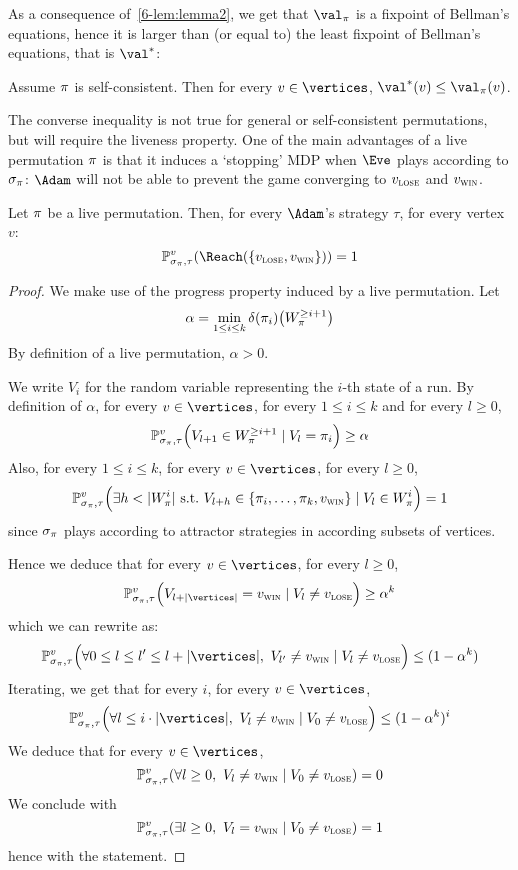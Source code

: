 As a consequence of~\cref{6-lem:lemma2}, we get that $\val_\perm$
is a fixpoint of Bellman's equations, hence it is larger than (or
equal to) the least fixpoint of Bellman's equations, that is $\val^*$:

\begin{corollary}
\label{6-cor:self-consistent_solution}
Assume $\pi$ is self-consistent.  Then for every $v \in
\vertices$, $\val^*(v) \le \val_\perm(v)$.
\end{corollary}

The converse inequality is not true for general or self-consistent
permutations, but will require the liveness property. One of the main
advantages of a live permutation $\pi$ is that it induces a
`stopping' MDP when $\Eve$ plays according to $\sigma_\pi$: 
$\Adam$ will not be able to prevent the game converging to $v_{\textsc{lose}}$ and $v_{\textsc{win}}$.

\begin{lemma}
\label{6-lem:live_stopping}
Let $\pi$ be a live permutation. Then, for every $\Adam$'s strategy
$\tau$, for every vertex $v$:
\[
\probm^v_{\sigma_\perm,\tau} (\Reach(\{\vlose,\vwin\})) = 1
\]
\end{lemma}

\begin{proof}
We make use of the progress property induced by a live permutation.
Let
\[
\alpha = \min_{1 \le i \le k} \delta(\pi_i) \big(W_\pi^{\ge
i+1}\big)
\]
By definition of a live permutation, $\alpha>0$.

We write $V_i$ for the random variable representing the $i$-th state
of a run.
%
By definition of $\alpha$, for every $v \in \vertices$, for every $1
\le i \le k$ and for every $l \ge 0$,
\[
\mathbb{P}^v_{\sigma_\pi,\tau}\Big(V_{l+1} \in W_\pi^{\ge i+1} \mid
V_l = \pi_i\Big) \ge \alpha
\]
Also, for every $1 \le i \le k$, for every $v \in \vertices$, for
every $l \ge 0$,
\[
\mathbb{P}^v_{\sigma_\pi,\tau}\Big(\exists h < |W_\pi^i|\
\text{s.t.}\ V_{l+h} \in \{\pi_i,\ldots,\pi_k,v_{\textsc{win}}\} \mid V_l
\in W_\pi^i\Big)=1
\]
since $\sigma_\pi$ plays according to attractor strategies in
according subsets of vertices.

Hence we deduce that for every $v \in \vertices$, for every $l \ge
0$,
\[
\probm^v_{\sigma_\perm,\tau}\Big(V_{l+|\vertices|}=\vwin \mid V_l
\ne \vlose\Big) \ge \alpha^k
\]
which we can rewrite as:
\[
\probm^v_{\sigma_\perm,\tau}\Big(\forall 0 \le l \le l' \le
l+|\vertices|,\ V_{l'} \ne \vwin \mid V_l \ne \vlose\Big) \le
(1-\alpha^k)
\]
Iterating, we get that for every $i$, for every $v \in \vertices$,
\[
\probm^v_{\sigma_\perm,\tau}\Big(\forall l \le i \cdot |\vertices|,\
V_{l} \ne \vwin \mid V_0 \ne \vlose\Big) \le (1-\alpha^k)^i
\]
We  deduce that for every $v \in \vertices$,
\[
\probm^v_{\sigma_\perm,\tau}(\forall l \ge 0,\ V_l \ne \vwin \mid
V_0 \ne \vlose) = 0
\]
We conclude with
\[
\probm^v_{\sigma_\perm,\tau}(\exists l \ge 0,\ V_l = \vwin \mid V_0
\ne \vlose) = 1
\]
hence with the statement.
\end{proof}

